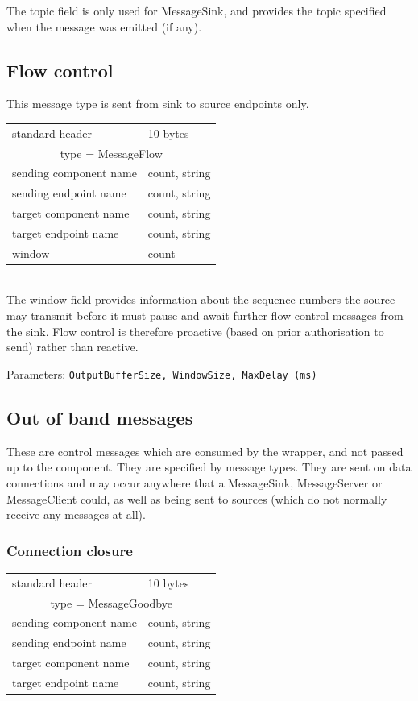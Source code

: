 \documentclass[12pt,a4paper,twoside]{article}
\renewcommand{\_}{\texttt{\symbol{95}}}
\begin{document}
The topic field is only used for MessageSink, and provides the
topic specified when the message was emitted (if any).

\subsection{Flow control}

This message type is sent from sink to source endpoints only.

\begin{tabular}{|ll|}
\hline
standard header    & 10 bytes\\
\multicolumn{2}{|c|}{type = MessageFlow}\\
\hline
sending component name  & count, string\\
sending endpoint name   & count, string\\
target component name   & count, string\\
target endpoint name    & count, string\\
window                  & count\\
\hline
\end{tabular}\\

The window field provides information about the sequence numbers the
source may transmit before it must pause and await further flow
control messages from the sink. Flow control is therefore proactive
(based on prior authorisation to send) rather than reactive.

Parameters: \verb^OutputBufferSize, WindowSize, MaxDelay (ms)^

\subsection{Out of band messages}

These are control messages which are consumed by the wrapper, and not
passed up to the component. They are specified by message types.
They are sent on data connections and may occur anywhere that a
MessageSink, MessageServer or MessageClient could, as well as being
sent to sources (which do not normally receive any messages at all).

\subsubsection{Connection closure}

\begin{tabular}{|ll|}
\hline
standard header    & 10 bytes\\
\multicolumn{2}{|c|}{type = MessageGoodbye}\\
\hline
sending component name  & count, string\\
sending endpoint name   & count, string\\
target component name   & count, string\\
target endpoint name    & count, string\\
\hline
\end{tabular}\\
\end{document}
